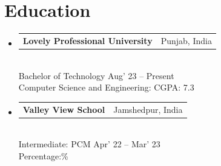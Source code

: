 \documentclass[10pt, a4paper]{article}
\makeatletter
\newcommand{\instituterow}[2]{%
  \noindent\begin{tabularx}{\linewidth}{@{}X@{\hspace{4pt}}r@{}}
    {\color{headingblue}\bfseries\fontsize{10pt}{12pt}\selectfont #1} &
    {\fontsize{8.5pt}{10pt}\selectfont #2}
  \end{tabularx}%
}
\makeatother
\begin{document}
\section{Education}
\vspace{4pt}
\begin{itemize}[itemsep=8pt]

  \item
    \instituterow{Lovely Professional University}{Punjab, India}\\[1pt]
    {\fontsize{8.5pt}{10pt}\selectfont Bachelor of Technology \hfill Aug' 23 -- Present}\\
    {\fontsize{8.5pt}{10pt}\selectfont Computer Science and Engineering: CGPA: 7.3}

  \item
    \instituterow{Valley View School}{Jamshedpur, India}\\[1pt]
    {\fontsize{8.5pt}{10pt}\selectfont Intermediate: PCM \hfill Apr' 22 -- Mar' 23}\\
    {\fontsize{8.5pt}{10pt}\selectfont Percentage:\%}

\end{itemize}
\end{document}
